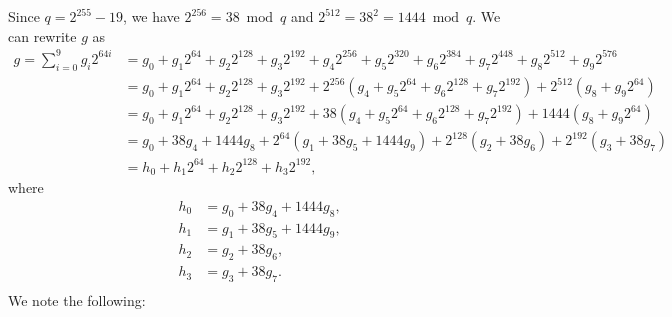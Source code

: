 \documentclass[a4paper, 12pt]{article}
\begin{document}
Since $q = 2^{255}-19$, we have $2^{256} = 38 \bmod q$ and $2^{512} = 38^2 = 1444 \bmod q$. We can rewrite $g$ as
\begin{align*}
  g  = \sum^{9}_{i=0} g_i 2^{64i} &= g_0 + g_1 2^{64} + g_2 2^{128} + g_3 2^{192} + g_4 2^{256} +   g_5 2^{320} + g_6 2^{384} + g_7 2^{448} + g_8 2^{512} + g_9 2^{576}\\
   &= g_0 + g_1 2^{64} + g_2 2^{128} + g_3 2^{192} + 2^{256} \left(  g_4 +   g_5 2^{64} + g_6 2^{128} + g_7 2^{192} \right) + 2^{512}\left(g_8  + g_9 2^{64} \right)\\
   &= g_0 + g_1 2^{64} + g_2 2^{128} + g_3 2^{192} + 38 \left(  g_4 +   g_5 2^{64} + g_6 2^{128} + g_7 2^{192} \right) + 1444 \left(g_8  + g_9 2^{64} \right)\\
   &= g_0 + 38 g_4 + 1444 g_8 + 2^{64} \left( g_1 + 38g_5 +1444g_9 \right)+ 2^{128} \left(  g_2 + 38 g_6\right) + 2^{192} \left( g_3 +38 g_7\right)\\
   & = h_0 + h_1 2^{64} + h_2 2^{128} + h_3 2^{192},
\end{align*}
where
\begin{align*}
  h_0 & = g_0 + 38 g_4 + 1444 g_8,\\
  h_1 & = g_1 + 38 g_5 + 1444 g_9,\\
  h_2 & = g_2 + 38 g_6,\\
  h_3 & = g_3 + 38 g_7.\\
\end{align*}
We note the following:
\end{document}
